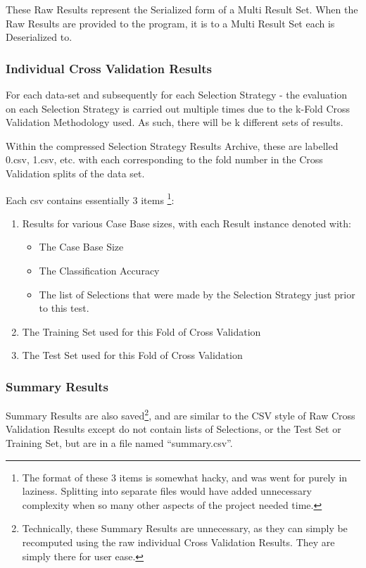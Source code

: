 \documentclass[a4paper,11pt]{report}
\begin{document}
These Raw Results represent the Serialized form of a Multi Result Set. When the Raw Results are provided to the program, it is to a Multi Result Set each is Deserialized to.

\subsubsection{Individual Cross Validation Results}
For each data-set and subsequently for each Selection Strategy - the evaluation on each Selection Strategy is carried out multiple times due to the k-Fold Cross Validation Methodology used. As such, there will be k different sets of results. 

Within the compressed Selection Strategy Results Archive, these are labelled 0.csv, 1.csv, etc. with each corresponding to the fold number in the Cross Validation splits of the data set.

Each csv contains essentially 3 items \footnote{The format of these 3 items is somewhat hacky, and was went for purely in laziness. Splitting into separate files would have added unnecessary complexity when so many other aspects of the project needed time.}:

\begin{enumerate}
	\item Results for various Case Base sizes, with each Result instance denoted with:
		\begin{itemize}
			\item The Case Base Size
			\item The Classification Accuracy
			\item The list of Selections that were made by the Selection Strategy just prior to this test.
		\end{itemize}
	\item The Training Set used for this Fold of Cross Validation
	\item The Test Set used for this Fold of Cross Validation
\end{enumerate}

\subsubsection{Summary Results}
Summary Results are also saved\footnote{Technically, these Summary Results are unnecessary, as they can simply be recomputed using the raw individual Cross Validation Results. They are simply there for user ease.}, and are similar to the CSV style of Raw Cross Validation Results except do not contain lists of Selections, or the Test Set or Training Set, but are in a file named ``summary.csv''.
\end{document}
